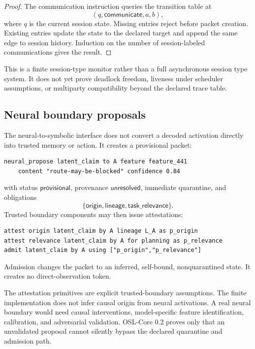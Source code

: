 \begin{proof}
The communication instruction queries the transition table at
\[
  (q,\mathsf{communicate},a,b),
\]
where $q$ is the current session state. Missing entries reject before packet
creation. Existing entries update the state to the declared target and append
the same edge to session history. Induction on the number of session-labeled
communications gives the result.
\end{proof}



This is a finite session-type monitor rather than a full asynchronous session
type system.  It does not yet prove deadlock freedom, liveness under scheduler
assumptions, or multiparty compatibility beyond the declared trace table.

\subsection{Neural boundary proposals}

The neural-to-symbolic interface does not convert a decoded activation directly
into trusted memory or action.  It creates a provisional packet:
\begin{lstlisting}[style=osl]
neural_propose latent_claim to A feature feature_441
    content "route-may-be-blocked" confidence 0.84
\end{lstlisting}
with status $\mathsf{provisional}$, provenance $\mathsf{unresolved}$, immediate
quarantine, and obligations
\[
  \{\mathsf{origin},\mathsf{lineage},\mathsf{task\_relevance}\}.
\]
Trusted boundary components may then issue attestations:
\begin{lstlisting}[style=osl]
attest origin latent_claim by A lineage L_A as p_origin
attest relevance latent_claim by A for planning as p_relevance
admit latent_claim by A using ["p_origin","p_relevance"]
\end{lstlisting}
Admission changes the packet to an inferred, self-bound, nonquarantined state.
It creates no direct-observation token.



\begin{boundarybox}
The attestation primitives are explicit trusted-boundary assumptions.  The
finite implementation does not infer causal origin from neural activations.  A
real neural boundary would need causal interventions, model-specific feature
identification, calibration, and adversarial validation.  OSL-Core 0.2 proves
only that an unvalidated proposal cannot silently bypass the declared
quarantine and admission path.
\end{boundarybox}

